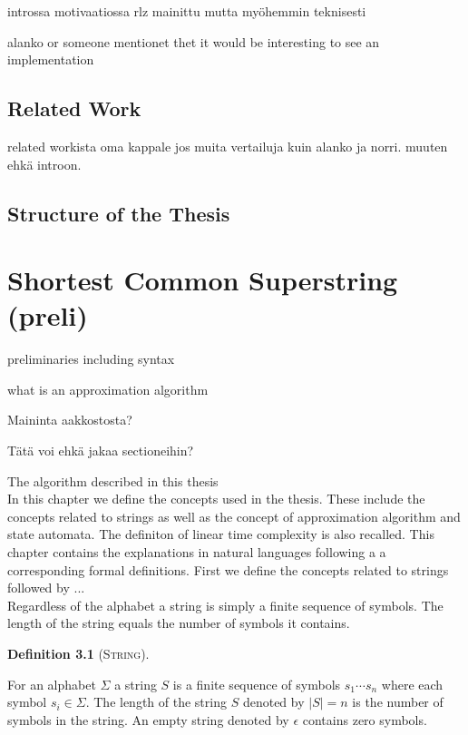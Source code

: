 \documentclass[english,twoside,censored,csm,algorithms-track-2020]{HYthesisML}
\theoremstyle{plain}
\theoremstyle{definition}
\newtheorem{definition}[equation]{Definition}
\begin{document}
  introssa motivaatiossa rlz mainittu mutta myöhemmin teknisesti
  
  alanko or someone mentionet thet it would be interesting to see an implementation

  \section{Related Work}

  related workista oma kappale jos muita vertailuja kuin alanko ja norri. muuten ehkä introon.
  
  \section{Structure of the Thesis}

\chapter {Shortest Common Superstring (preli)}


preliminaries including syntax

what is an approximation algorithm

Maininta aakkostosta?

Tätä voi ehkä jakaa sectioneihin?

The algorithm described in this thesis \\[1in]



In this chapter we define the concepts used in the thesis. These include the concepts related to strings as well as the concept of approximation algorithm
and state automata. The definiton of linear time complexity is also recalled. This chapter contains the explanations in natural languages following a
a corresponding formal definitions. First we define the concepts related to strings followed by ...  \\[1in]



Regardless of the alphabet a string is simply a finite sequence of symbols. The length of the string equals the number of symbols it contains. 

\begin{definition}[\textsc{String}]~\label{def-string}
  
  For an alphabet $\Sigma$ a string $S$ is a finite sequence of symbols  ${s_1\cdots s_n}$ where each symbol $s_i \in \Sigma$.
  The length of the string $S$ denoted by $|S| = n$ is the number of symbols in the string.
  An empty string denoted by $\epsilon$ contains zero symbols.
  
\end{definition}
\end{document}

